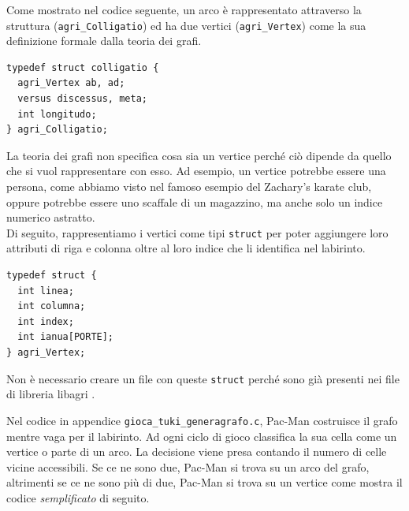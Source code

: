 \documentclass[8pt]{book}
\begin{document}
Come mostrato nel codice seguente, un arco è rappresentato attraverso la struttura (\texttt{agri\_Colligatio}) ed ha due vertici (\texttt{agri\_Vertex}) come la sua definizione formale dalla teoria dei grafi.

\begin{spacing}{0.9}
  \begin{small}
    \begin{tcolorbox}
\begin{verbatim}
typedef struct colligatio {
  agri_Vertex ab, ad;
  versus discessus, meta;
  int longitudo;
} agri_Colligatio; 
\end{verbatim}
    \end{tcolorbox}
  \end{small}
\end{spacing}

La teoria dei grafi non specifica cosa sia un vertice perché ciò dipende da quello che si vuol rappresentare con esso. Ad esempio, un vertice potrebbe essere una persona, come abbiamo visto nel famoso esempio del Zachary's karate club, oppure potrebbe essere uno scaffale di un magazzino, ma anche solo un indice numerico astratto.\\
Di seguito, rappresentiamo i vertici come tipi \texttt{struct} per poter aggiungere loro attributi di riga e colonna oltre al loro indice che li identifica nel labirinto.

\begin{spacing}{0.9}
  \begin{small}
    \begin{tcolorbox}
\begin{verbatim}
typedef struct {
  int linea;
  int columna;
  int index;
  int ianua[PORTE];
} agri_Vertex; 
\end{verbatim}
    \end{tcolorbox}
  \end{small}
\end{spacing}

Non è necessario creare un file con queste \texttt{struct} perché sono già presenti nei file di libreria libagri .

Nel codice in appendice \texttt{gioca\_tuki\_generagrafo.c}, Pac-Man costruisce il grafo mentre vaga per il labirinto. Ad ogni ciclo di gioco classifica la sua cella come un vertice o parte di un arco. La decisione viene presa contando il numero di celle vicine accessibili. Se ce ne sono due, Pac-Man si trova su un arco del grafo, altrimenti se ce ne sono più di due, Pac-Man si trova su un vertice come mostra il codice \emph{semplificato} di seguito.
\end{document}
